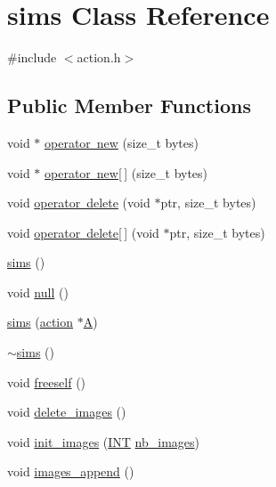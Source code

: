 \hypertarget{classsims}{}\section{sims Class Reference}
\label{classsims}


{\ttfamily \#include $<$action.\+h$>$}

\subsection*{Public Member Functions}
\begin{DoxyCompactItemize}
\item 
void $\ast$ \mbox{\hyperlink{classsims_a6aeefc9697cb10f60e76c2b0e69e48ef}{operator new}} (size\+\_\+t bytes)
\item 
void $\ast$ \mbox{\hyperlink{classsims_a32921b09a44038da87de06573e9cdc17}{operator new\mbox{[}$\,$\mbox{]}}} (size\+\_\+t bytes)
\item 
void \mbox{\hyperlink{classsims_ad613390ec8ecb625454785ccc222d1d2}{operator delete}} (void $\ast$ptr, size\+\_\+t bytes)
\item 
void \mbox{\hyperlink{classsims_a5eaebf678ba04cf9022bceb41b643455}{operator delete\mbox{[}$\,$\mbox{]}}} (void $\ast$ptr, size\+\_\+t bytes)
\item 
\mbox{\hyperlink{classsims_ab96260ec513fe30c37c7a1933f4d6e7f}{sims}} ()
\item 
void \mbox{\hyperlink{classsims_a47d4aacfa330b9a59d87fb6bf7529e08}{null}} ()
\item 
\mbox{\hyperlink{classsims_a2eada2ad0e325eabb600f63769400b27}{sims}} (\mbox{\hyperlink{classaction}{action}} $\ast$\mbox{\hyperlink{classsims_a3311c97dc08837220191985b1c7ee73f}{A}})
\item 
\mbox{\hyperlink{classsims_a7cc925349e00203fae2e4a54ca3788b3}{$\sim$sims}} ()
\item 
void \mbox{\hyperlink{classsims_ab596438fd94e1fcafbf69d32024e93bf}{freeself}} ()
\item 
void \mbox{\hyperlink{classsims_a5a4fd410f399c81c847052861e3bc3ff}{delete\+\_\+images}} ()
\item 
void \mbox{\hyperlink{classsims_a7fb1a9d3c6355c551f495d3d79e2303e}{init\+\_\+images}} (\mbox{\hyperlink{galois_8h_a09fddde158a3a20bd2dcadb609de11dc}{I\+NT}} \mbox{\hyperlink{classsims_af6b4c88343d7529f126a8256cdaeb8fe}{nb\+\_\+images}})
\item 
void \mbox{\hyperlink{classsims_a2eedbb17ba9644f7d57d81dafab0eb01}{images\+\_\+append}} ()

\end{DoxyCompactItemize}
